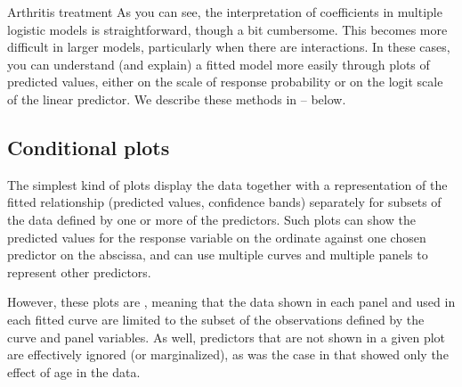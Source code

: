 \documentclass[11pt]{book}\usepackage[]{graphicx}\usepackage[]{color}
\begin{document}
\begin{Example}{Arthritis treatment}
As you can see, the interpretation of coefficients in multiple logistic models
is straightforward, though a bit cumbersome.  This becomes more difficult in
larger models, particularly when there are interactions.  In these cases, 
you can understand (and explain) a fitted model more easily through plots of
predicted values, either on the scale of response probability or on the logit
scale of the linear predictor.  We describe these methods in 
-- below.

 
\end{Example}

\subsection{Conditional plots}\label{sec:logist-condplots}
The simplest kind of plots display the data together with a representation
of the fitted relationship (predicted values, confidence bands) 
separately for subsets of the data defined by one or more of the predictors.
Such plots can show the predicted values for the response variable on the ordinate
against one chosen predictor on the abscissa, and can use multiple curves
and multiple panels to represent other predictors.

However, these plots are , meaning that the data 
shown in each panel and used in each fitted curve are limited to the subset
of the observations defined by the curve and panel variables.  As well, 
predictors that are not shown in a given plot are effectively ignored
(or marginalized), as was the case in 
that showed only the effect of age in the  data.
\end{document}
